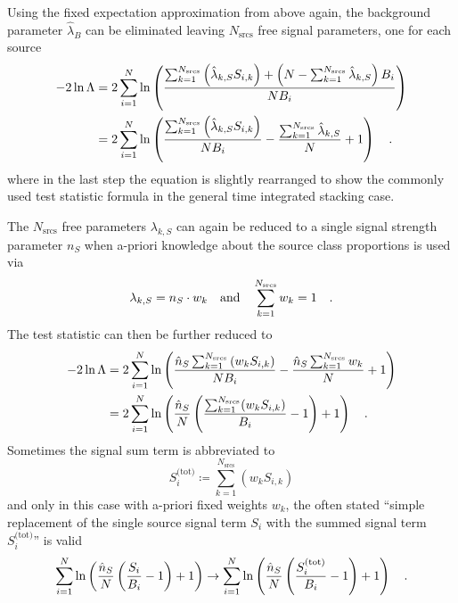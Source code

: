 Using the fixed expectation approximation from above again, the background parameter $\hat{\lambda}_B$ can be eliminated leaving $N_\text{srcs}$ free signal parameters, one for each source
\begin{align}
  -2\ln\Lambda
  &= 2\sum_{i=1}^N \ln\left(
    \frac{\sum_{k=1}^{N_\text{srcs}}\left(\hat{\lambda}_{k,S} S_{i,k}\right) +
          \left(
            N - \sum_{k=1}^{N_\text{srcs}}\hat{\lambda}_{k,S}
          \right) B_i}{N B_i} \right) \\
  &= 2\sum_{i=1}^N \ln\left(
      \frac{\sum_{k=1}^{N_\text{srcs}}\left(\hat{\lambda}_{k,S}
              S_{i,k}\right)}{N B_i} -
      \frac{\sum_{k=1}^{N_\text{srcs}}\hat{\lambda}_{k,S}}{N} + 1
    \right)
  \quad\text{.}
\end{align}
where in the last step the equation is slightly rearranged to show the commonly used test statistic formula in the general time integrated stacking case.

The $N_\text{srcs}$ free parameters $\lambda_{k,S}$ can again be reduced to a single signal strength parameter $n_S$ when a-priori knowledge about the source class proportions is used via
\begin{equation}
  \lambda_{k,S} = n_S \cdot w_k
  \quad\text{and}\quad
  \sum_{k=1}^{N_\text{srcs}} w_k = 1
  \quad\text{.}
\end{equation}
The test statistic can then be further reduced to
\begin{align}
  -2\ln\Lambda
  &= 2\sum_{i=1}^N \ln\left(
        \frac{\hat{n}_S \sum_{k=1}^{N_\text{srcs}}\left(w_k S_{i,k}\right)}
             {N B_i} -
        \frac{\hat{n}_S \sum_{k=1}^{N_\text{srcs}}w_k}{N} + 1
      \right) \\
  &= 2\sum_{i=1}^N \ln\left(
        \frac{\hat{n}_S}{N}\left(
          \frac{\sum_{k=1}^{N_\text{srcs}}(w_k S_{i,k})}{B_i} - 1
        \right) + 1
      \right)
  \quad\text{.}
\end{align}
Sometimes the signal sum term is abbreviated to
\begin{equation}
  S_i^\text{(tot)} \coloneqq \sum_{k=1}^{N_\text{srcs}}\left(w_k S_{i,k}\right)
\end{equation}
and only in this case with a-priori fixed weights $w_k$, the often stated \enquote{simple replacement of the single source signal term $S_i$ with the summed signal term $S_i^\text{(tot)}$} is valid
\begin{equation}
  \sum_{i=1}^N \ln\left(
      \frac{\hat{n}_S}{N}\left( \frac{S_i}{B_i} - 1 \right) + 1
    \right)
  \rightarrow
  \sum_{i=1}^N \ln\left(
      \frac{\hat{n}_S}{N}\left( \frac{S_i^\text{(tot)}}{B_i} - 1 \right) + 1
    \right)
  \quad\text{.}
\end{equation}

